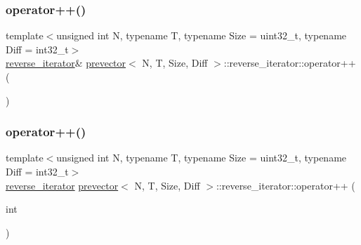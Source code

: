 \subsubsection{\texorpdfstring{operator++()}{operator++()}\hspace{0.1cm}{\footnotesize\ttfamily [1/2]}}
{\footnotesize\ttfamily template$<$unsigned int N, typename T, typename Size = uint32\+\_\+t, typename Diff = int32\+\_\+t$>$ \\
\mbox{\hyperlink{classprevector_1_1reverse__iterator}{reverse\+\_\+iterator}}\& \mbox{\hyperlink{classprevector}{prevector}}$<$ N, T, Size, Diff $>$\+::reverse\+\_\+iterator\+::operator++ (\begin{DoxyParamCaption}{ }\end{DoxyParamCaption})\hspace{0.3cm}{\ttfamily [inline]}}

\mbox{\label{classprevector_1_1reverse__iterator_a061d083208c9bc184d9ea6bcbc3cf239}} 
\subsubsection{\texorpdfstring{operator++()}{operator++()}\hspace{0.1cm}{\footnotesize\ttfamily [2/2]}}
{\footnotesize\ttfamily template$<$unsigned int N, typename T, typename Size = uint32\+\_\+t, typename Diff = int32\+\_\+t$>$ \\
\mbox{\hyperlink{classprevector_1_1reverse__iterator}{reverse\+\_\+iterator}} \mbox{\hyperlink{classprevector}{prevector}}$<$ N, T, Size, Diff $>$\+::reverse\+\_\+iterator\+::operator++ (\begin{DoxyParamCaption}\item[{int}]{ }\end{DoxyParamCaption})\hspace{0.3cm}{\ttfamily [inline]}}

\mbox{\label{classprevector_1_1reverse__iterator_abce3eff5c64cec50415a27044ea46266}} 

